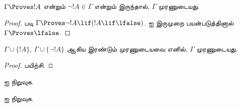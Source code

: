 \documentclass[../../../include/open-logic-section]{subfiles}
\begin{document}
\begin{prop}
  $\Gamma \Proves !A$ என்றும் $\lnot !A \in \Gamma$ என்றும் இருந்தால்,
  $\Gamma$ முரணுடையது.
\end{prop}

\begin{proof}
   படி $\Gamma \Proves \lnot !A \lif (!A \lif
  \lfalse)$.  ஐ இருமுறை பயன்படுத்தினால் $\Gamma
  \Proves \lfalse$.
\end{proof}

\begin{prop}
  $\Gamma \cup \{!A\}$, $\Gamma \cup \{\lnot !A\}$ ஆகிய இரண்டும்
  முரணுடையவை எனில், $\Gamma$ முரணுடையது.
\end{prop}

\begin{proof}
பயிற்சி.
\end{proof}

\begin{prob}
   ஐ நிறுவுக.
\end{prob}
\tagendprob

\begin{prob}
   ஐ நிறுவுக.
\end{prob}
\tagendprob
\end{document}
